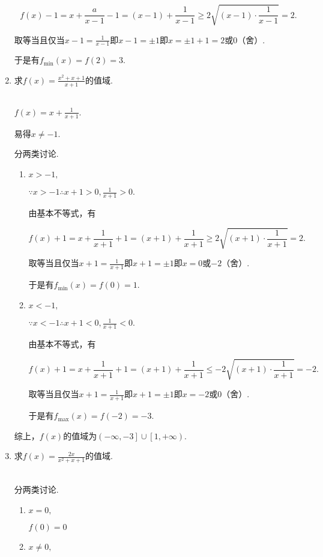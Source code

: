 \documentclass[8pt]{article}
\begin{document}
\begin{enumerate}[(1)]
			$$f(x)-1=x+\frac{a}{x-1}-1=(x-1)+\frac{1}{x-1}\geq2\sqrt{(x-1)\cdot\frac{1}{x-1}}=2.$$

			取等当且仅当$x-1=\frac{1}{x-1}$即$x-1=\pm1$即$x=\pm1+1=2$或$0$（舍）.

			于是有$f_{\min}(x)=f(2)=3.$

		\item
			求$f(x)=\frac{x^2+x+1}{x+1}$的值域.

			~\\
			$f(x)=x+\frac{1}{x+1}.$

			易得$x\neq-1$.

			分两类讨论.

			\begin{enumerate}[$1^\circ$]
				\item
					$x>-1,$

					$\because x>-1 \therefore x+1>0, \frac{1}{x+1}>0.$

					由基本不等式，有

					$$f(x)+1=x+\frac{1}{x+1}+1=(x+1)+\frac{1}{x+1}\geq2\sqrt{(x+1)\cdot\frac{1}{x+1}}=2.$$

					取等当且仅当$x+1=\frac{1}{x+1}$即$x+1=\pm1$即$x=0$或$-2$（舍）.

					于是有$f_{\min}(x)=f(0)=1.$

				\item
					$x<-1,$

					$\because x<-1 \therefore x+1<0, \frac{1}{x+1}<0.$

					由基本不等式，有

					$$f(x)+1=x+\frac{1}{x+1}+1=(x+1)+\frac{1}{x+1}\leq-2\sqrt{(x+1)\cdot\frac{1}{x+1}}=-2.$$

					取等当且仅当$x+1=\frac{1}{x+1}$即$x+1=\pm1$即$x=-2$或$0$（舍）.

					于是有$f_{\max}(x)=f(-2)=-3.$

			\end{enumerate}

			综上，$f(x)$的值域为$\left(-\infty, -3\right]\cup\left[1,+\infty\right)$.

		\item
			求$f(x)=\frac{2x}{x^2+x+1}$的值域.

			~\\
			分两类讨论.

			\begin{enumerate}[$1^\circ$]
				\item
					$x=0,$

					$f(0)=0$

				\item
					$x\neq 0,$


\end{enumerate}
\end{enumerate}
\end{document}
